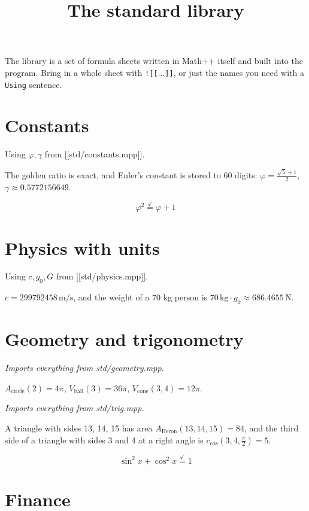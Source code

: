 \documentclass[11pt,a4paper]{article}
\title{The standard library}
\date{}
\theoremstyle{plain}
\theoremstyle{definition}
\theoremstyle{remark}
\begin{document}
\maketitle
The library is a set of formula sheets written in Math++ itself and built into the program. Bring in a whole sheet with \texttt{![[$\ldots$]]}, or just the names you need with a \texttt{Using} sentence.

\section*{Constants}

Using $\varphi, \gamma$ from [[std/constants.mpp]].

The golden ratio is exact, and Euler's constant is stored to 60 digits: $\varphi = \frac{\sqrt{5} + 1}{2}$, $\gamma \approx 0.5772156649$.

\begin{equation*}
  \varphi^2 \overset{\checkmark }{=} \varphi + 1
\end{equation*}
\section*{Physics with units}

Using $c, g_0, G$ from [[std/physics.mpp]].

$c = 299792458\,\mathrm{m/s}$, and the weight of a 70 kg person is $70\,\mathrm{kg} \cdot g_0 \approx 686.4655\,\mathrm{N}$.

\section*{Geometry and trigonometry}

\textit{Imports everything from std/geometry.mpp.}

$A_{\text{circle}}(2) = 4 \pi$, $V_{\text{ball}}(3) = 36 \pi$, $V_{\text{cone}}(3, 4) = 12 \pi$.

\textit{Imports everything from std/trig.mpp.}

A triangle with sides 13, 14, 15 has area $A_{\text{Heron}}(13, 14, 15) = 84$, and the third side of a triangle with sides 3 and 4 at a right angle is $c_{\text{cos}}(3, 4, \tfrac{\pi}{2}) = 5$.

\begin{equation*}
  \sin^2 x + \cos^2 x \overset{\checkmark }{=} 1
\end{equation*}
\section*{Finance}
\end{document}
